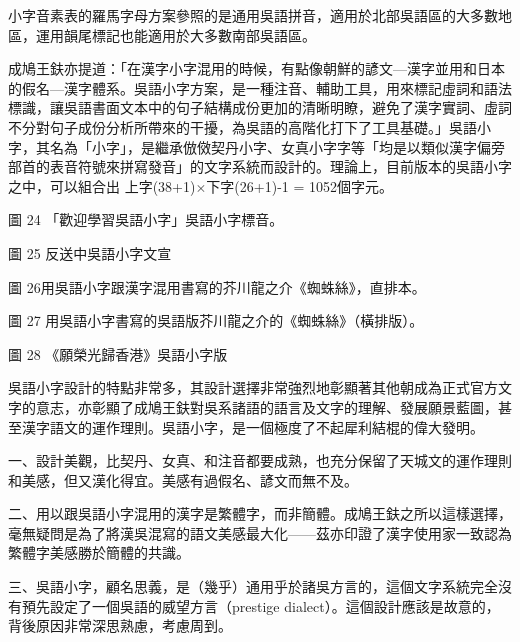 \documentclass[a5paper, 12pt, openany]{book} %
\begin{document}
小字音素表的羅馬字母方案參照的是通用吳語拼音，適用於北部吳語區的大多數地區，運用韻尾標記也能適用於大多數南部吳語區。 

成鳩王鈇亦提道：「在漢字小字混用的時候，有點像朝鮮的諺文—漢字並用和日本的假名—漢字體系。吳語小字方案，是一種注音、輔助工具，用來標記虛詞和語法標識，讓吳語書面文本中的句子結構成份更加的清晰明瞭，避免了漢字實詞、虛詞不分對句子成份分析所帶來的干擾，為吳語的高階化打下了工具基礎。」吳語小字，其名為「小字」，是繼承倣傚契丹小字、女真小字字等「均是以類似漢字偏旁部首的表音符號來拼寫發音」的文字系統而設計的。理論上，目前版本的吳語小字之中，可以組合出 上字(38+1)$\times$下字(26+1)-1 = 1052個字元。  



圖 24 「歡迎學習吳語小字」吳語小字標音。

圖 25 反送中吳語小字文宣



圖 26用吳語小字跟漢字混用書寫的芥川龍之介《蜘蛛絲》，直排本。


圖 27 用吳語小字書寫的吳語版芥川龍之介的《蜘蛛絲》（橫排版）。

圖 28 《願榮光歸香港》吳語小字版


吳語小字設計的特點非常多，其設計選擇非常強烈地彰顯著其他朝成為正式官方文字的意志，亦彰顯了成鳩王鈇對吳系諸語的語言及文字的理解、發展願景藍圖，甚至漢字語文的運作理則。吳語小字，是一個極度了不起犀利結棍的偉大發明。

一、設計美觀，比契丹、女真、和注音都要成熟，也充分保留了天城文的運作理則和美感，但又漢化得宜。美感有過假名、諺文而無不及。

二、用以跟吳語小字混用的漢字是繁體字，而非簡體。成鳩王鈇之所以這樣選擇，毫無疑問是為了將漢吳混寫的語文美感最大化——茲亦印證了漢字使用家一致認為繁體字美感勝於簡體的共識。

三、吳語小字，顧名思義，是（幾乎）通用乎於諸吳方言的，這個文字系統完全沒有預先設定了一個吳語的威望方言（prestige dialect）。這個設計應該是故意的，背後原因非常深思熟慮，考慮周到。
\end{document}
